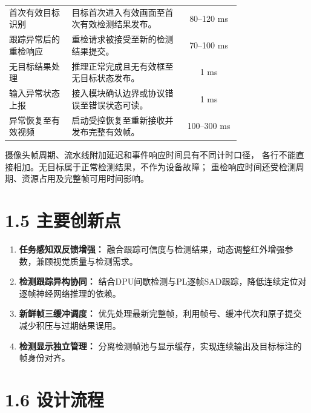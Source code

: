 \documentclass[UTF8,a4paper,12pt,fontset=windows]{ctexart}
\begin{document}
\begin{longtable}{
    >{\raggedright\arraybackslash}p{0.27\linewidth}
    >{\raggedright\arraybackslash}p{0.49\linewidth}
    c
}
首次有效目标识别
& 目标首次进入有效画面至首次有效检测结果发布。
& 80--120 ms \\

跟踪异常后的重检响应
& 重检请求被接受至新的检测结果提交。
& 70--100 ms \\

无目标结果处理
& 推理正常完成且无有效框至无目标状态发布。
& 1 ms \\

输入异常状态上报
& 接入模块确认边界或协议错误至错误状态可读。
& 1 ms \\

异常恢复至有效视频
& 启动受控恢复至重新接收并发布完整有效帧。
& 100--300 ms \\

\end{longtable}
\endgroup

\noindent
摄像头帧周期、流水线附加延迟和事件响应时间具有不同计时口径，
各行不能直接相加。无目标属于正常检测结果，不作为设备故障；
重检响应时间还受检测周期、资源占用及完整帧可用时间影响。


\FloatBarrier
{}
\section*{1.5 主要创新点}

\begin{enumerate}
    \item \textbf{任务感知双反馈增强：}
    融合跟踪可信度与检测结果，动态调整红外增强参数，兼顾视觉质量与检测需求。

    \item \textbf{检测跟踪异构协同：}
    结合DPU间歇检测与PL逐帧SAD跟踪，降低连续定位对逐帧神经网络推理的依赖。

    \item \textbf{新鲜帧三缓冲调度：}
    优先处理最新完整帧，利用帧号、缓冲代次和原子提交减少积压与过期结果误用。

    \item \textbf{检测显示独立管理：}
    分离检测帧池与显示缓存，实现连续输出及目标标注的帧身份对齐。
\end{enumerate}


\FloatBarrier
\section*{1.6 设计流程}
\end{document}
